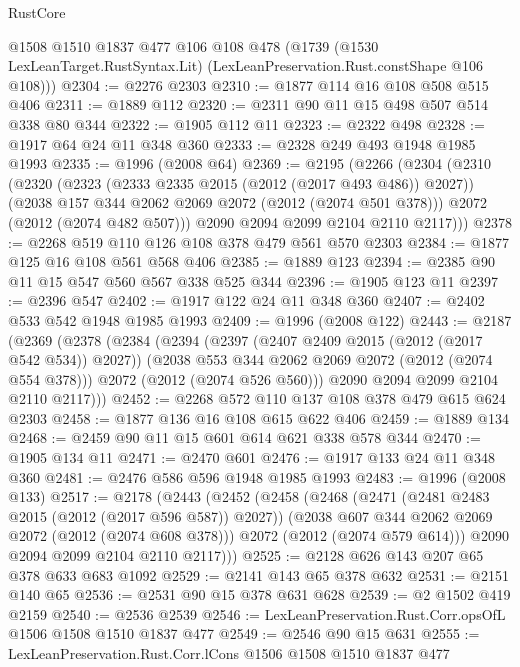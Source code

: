 \begin{lexlean}{RustCore}
\begin{coremodule}
      @1508
      @1510
      @1837
      @477
      @106
      @108
      @478
      (@1739 (@1530 LexLeanTarget.RustSyntax.Lit) (LexLeanPreservation.Rust.constShape @106 @108)))
@2304 := @2276 @2303
@2310 := @1877 @114 @16 @108 @508 @515 @406
@2311 := @1889 @112
@2320 := @2311 @90 @11 @15 @498 @507 @514 @338 @80 @344
@2322 := @1905 @112 @11
@2323 := @2322 @498
@2328 := @1917 @64 @24 @11 @348 @360
@2333 := @2328 @249 @493 @1948 @1985 @1993
@2335 := @1996 (@2008 @64)
@2369 := @2195
    (@2266
      (@2304
        (@2310
          (@2320
            (@2323 (@2333 @2335 @2015 (@2012 (@2017 @493 @486)) @2027))
            (@2038 @157 @344 @2062 @2069 @2072 (@2012 (@2074 @501 @378)))
            @2072
            (@2012 (@2074 @482 @507)))
          @2090
          @2094
          @2099
          @2104
          @2110
          @2117)))
@2378 := @2268 @519 @110 @126 @108 @378 @479 @561 @570 @2303
@2384 := @1877 @125 @16 @108 @561 @568 @406
@2385 := @1889 @123
@2394 := @2385 @90 @11 @15 @547 @560 @567 @338 @525 @344
@2396 := @1905 @123 @11
@2397 := @2396 @547
@2402 := @1917 @122 @24 @11 @348 @360
@2407 := @2402 @533 @542 @1948 @1985 @1993
@2409 := @1996 (@2008 @122)
@2443 := @2187
    (@2369
      (@2378
        (@2384
          (@2394
            (@2397 (@2407 @2409 @2015 (@2012 (@2017 @542 @534)) @2027))
            (@2038 @553 @344 @2062 @2069 @2072 (@2012 (@2074 @554 @378)))
            @2072
            (@2012 (@2074 @526 @560)))
          @2090
          @2094
          @2099
          @2104
          @2110
          @2117)))
@2452 := @2268 @572 @110 @137 @108 @378 @479 @615 @624 @2303
@2458 := @1877 @136 @16 @108 @615 @622 @406
@2459 := @1889 @134
@2468 := @2459 @90 @11 @15 @601 @614 @621 @338 @578 @344
@2470 := @1905 @134 @11
@2471 := @2470 @601
@2476 := @1917 @133 @24 @11 @348 @360
@2481 := @2476 @586 @596 @1948 @1985 @1993
@2483 := @1996 (@2008 @133)
@2517 := @2178
    (@2443
      (@2452
        (@2458
          (@2468
            (@2471 (@2481 @2483 @2015 (@2012 (@2017 @596 @587)) @2027))
            (@2038 @607 @344 @2062 @2069 @2072 (@2012 (@2074 @608 @378)))
            @2072
            (@2012 (@2074 @579 @614)))
          @2090
          @2094
          @2099
          @2104
          @2110
          @2117)))
@2525 := @2128 @626 @143 @207 @65 @378 @633 @683 @1092
@2529 := @2141 @143 @65 @378 @632
@2531 := @2151 @140 @65
@2536 := @2531 @90 @15 @378 @631 @628
@2539 := @2 @1502 @419 @2159
@2540 := @2536 @2539
@2546 := LexLeanPreservation.Rust.Corr.opsOfL @1506 @1508 @1510 @1837 @477
@2549 := @2546 @90 @15 @631
@2555 := LexLeanPreservation.Rust.Corr.lCons @1506 @1508 @1510 @1837 @477

\end{coremodule}
\end{lexlean}
